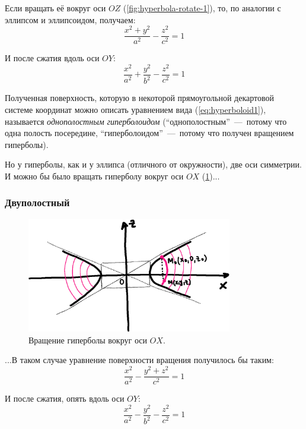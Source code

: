 \documentclass[a4paper,12pt]{article}
\begin{document}
  Если вращать её вокруг оси $OZ$ (\ref{fig:hyperbola-rotate-1}), то, по аналогии с эллипсом и эллипсоидом, получаем:
  \[
    \frac{x^2 + y^2}{a^2} - \frac{z^2}{c^2} = 1
  \]
  
  И после сжатия вдоль оси $OY$:
  \begin{equation}
    \label{eq:hyperboloid1}
    \boxed{
      \frac{x^2}{a^2} + \frac{y^2}{b^2} - \frac{z^2}{c^2} = 1
    }
  \end{equation}
  
  Полученная поверхность, которую в некоторой прямоугольной декартовой системе координат можно описать уравнением вида (\ref{eq:hyperboloid1}), называется \emph{однополостным гиперболоидом} (``однополостным''~---~потому что одна полость посередине, ``гиперболоидом''~---~потому что получен вращением гиперболы).
  
  Но у гиперболы, как и у эллипса (отличного от окружности), две оси симметрии.
  И можно бы было вращать гиперболу вокруг оси $OX$ (\ref{fig:hyperbola-rotate-2})...
  
  
  \subsubsection{Двуполостный}
  
  \begin{figure}[h]
    \centering

    \includegraphics[width=0.8\textwidth]{hyperbola-rotate-2}
  
    \caption{Вращение гиперболы вокруг оси $OX$.}
    \label{fig:hyperbola-rotate-2}
  \end{figure}
  
  ...В таком случае уравнение поверхности вращения получилось бы таким:
  \[
    \frac{x^2}{a^2} - \frac{y^2 + z^2}{c^2} = 1
  \]
  
  И после сжатия, опять вдоль оси $OY$:
  \begin{equation}
    \label{eq:hyperboloid2}
    \boxed{
      \frac{x^2}{a^2} - \frac{y^2}{b^2} - \frac{z^2}{c^2} = 1
    }
  \end{equation}
  
\end{document}
